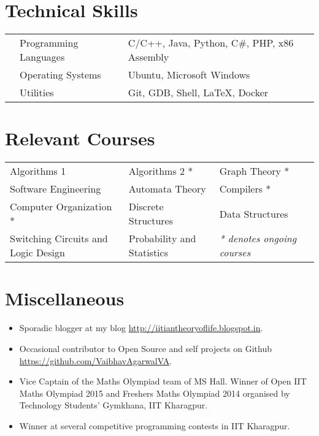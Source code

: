 \documentclass[11pt,a4paper]{moderncv}
\begin{document}
\section*{Technical Skills}
\begin{tabular}{L{0.05cm} L{5cm} l}
  &Programming Languages      &C/C++, Java, Python, C\#, PHP, x86 Assembly\\
  &Operating Systems	        &Ubuntu, Microsoft Windows\\
  &Utilities                  &Git, GDB, Shell, \LaTeX, Docker\\
\end{tabular}

\section*{Relevant Courses}
\begin{tabular}{L{7.2cm} L{6.0cm} L{5.6cm}l}
  Algorithms 1 & Algorithms 2 * &
  Graph Theory * \\  Software Engineering & Automata Theory &  Compilers * \\
  Computer Organization *  & Discrete Structures & Data Structures\\
  Switching Circuits and Logic Design &
  Probability and Statistics & \textit{* denotes ongoing courses} \\
\end{tabular}

\section*{Miscellaneous}
\begin{itemize}
  \item Sporadic blogger at my blog \url{http://iitiantheoryoflife.blogspot.in}.
  \item Occasional contributor to Open Source and self projects on Github
    \url{https://github.com/VaibhavAgarwalVA}.
  \item Vice Captain of the Maths Olympiad team of MS Hall. Winner of Open IIT Maths Olympiad 2015 and Freshers Maths Olympiad 2014 organised by Technology Students' Gymkhana, IIT Kharagpur.
  \item Winner at several competitive programming contests in IIT Kharagpur.  
\end{itemize}
\end{document}
